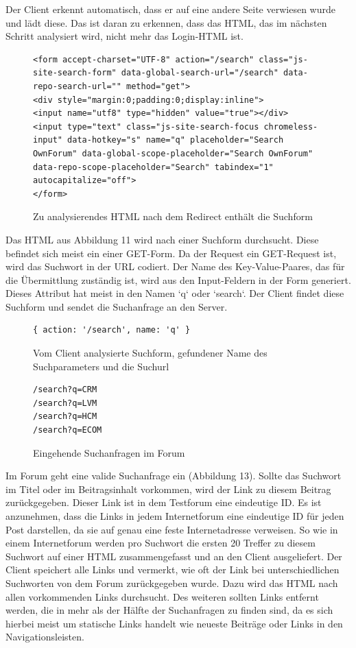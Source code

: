 Der Client erkennt automatisch, dass er auf eine andere Seite verwiesen wurde und lädt diese. Das ist daran zu erkennen, dass das HTML, das im nächsten Schritt analysiert wird, nicht mehr das Login-HTML ist.

\begin{figure}[h!]
\begin{lstlisting}[language=HTML5]
<form accept-charset="UTF-8" action="/search" class="js-site-search-form" data-global-search-url="/search" data-repo-search-url="" method="get">
<div style="margin:0;padding:0;display:inline">
<input name="utf8" type="hidden" value="true"></div>
<input type="text" class="js-site-search-focus chromeless-input" data-hotkey="s" name="q" placeholder="Search OwnForum" data-global-scope-placeholder="Search OwnForum" data-repo-scope-placeholder="Search" tabindex="1" autocapitalize="off">
</form>
\end{lstlisting}
\caption{Zu analysierendes HTML nach dem Redirect enthält die Suchform}
\end{figure}

Das HTML aus Abbildung 11 wird nach einer Suchform durchsucht. Diese befindet sich meist ein einer GET-Form. Da der Request ein GET-Request ist, wird das Suchwort in der URL codiert. Der Name des Key-Value-Paares, das für die Übermittlung zuständig ist, wird aus den Input-Feldern in der Form generiert. Dieses Attribut hat meist in den Namen `q` oder `search`. Der Client findet diese Suchform und sendet die Suchanfrage an den Server.


\begin{figure}[ht]
\begin{lstlisting}[language=HTML5]
{ action: '/search', name: 'q' }
\end{lstlisting}
\caption{Vom Client analysierte Suchform, gefundener Name des Suchparameters und die Suchurl}
\end{figure}

\newpage


\begin{figure}[ht]
\begin{lstlisting}[language=HTML5]
/search?q=CRM
/search?q=LVM
/search?q=HCM
/search?q=ECOM
\end{lstlisting}
\caption{Eingehende Suchanfragen im Forum }
\end{figure}
Im Forum geht eine valide Suchanfrage ein (Abbildung 13).
Sollte das Suchwort im Titel oder im Beitragsinhalt vorkommen, wird der Link zu diesem Beitrag zurückgegeben. Dieser Link ist in dem Testforum eine eindeutige ID. Es ist anzunehmen, dass die Links in jedem Internetforum eine eindeutige ID für jeden Post darstellen, da sie auf genau eine feste Internetadresse verweisen. So wie in einem Internetforum werden pro Suchwort die ersten 20 Treffer zu diesem Suchwort auf einer HTML zusammengefasst und an den Client ausgeliefert. Der Client speichert alle Links und vermerkt, wie oft der Link bei unterschiedlichen Suchworten von dem Forum zurückgegeben wurde. Dazu wird das HTML nach allen vorkommenden Links durchsucht. Des weiteren sollten Links entfernt werden, die in mehr als der Hälfte der Suchanfragen zu finden sind, da es sich hierbei meist um statische Links handelt wie neueste Beiträge oder Links in den Navigationsleisten.
\newpage

